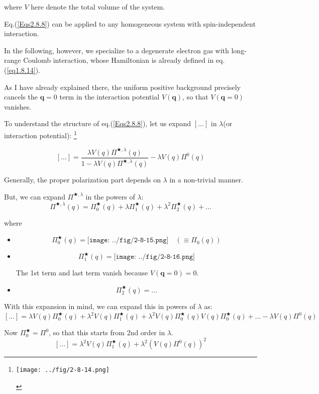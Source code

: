 where $V$ here denote the total volume of the system.

Eq.(\ref{Eqs2.8.8}) can be applied to any homogeneous system with spin-independent interaction.

In the following, however, we specialize to a degenerate electron gas with long-range Coulomb interaction, whose Hamiltonian is already defined in eq.(\ref{eq1.8.14}).

As I have already explained there, the uniform positive background precisely cancels the $\mathbf{q}=0$ term in the interaction potential $V(\mathbf{q})$, so that $V(\mathbf{q}=0)$ vanishes.

To understand the structure of eq.(\ref{Eqs2.8.8}), let us expand $\left[ \ldots \right]$ in $\lambda$(or interaction potential):
\footnote{\begin{center} \label{Fig2.8.14}
\texttt{[image: ../fig/2-8-14.png]}
\end{center}}

\[[\ldots] = \frac{\lambda V(q)\Pi^{\bigstar,\lambda}(q)}{1-\lambda V(q)\Pi^{\bigstar,\lambda}(q)} - \lambda V(q)\Pi^0(q)\]

Generally, the proper polarization part depends on $\lambda$ in a non-trivial manner.

But, we can expand $\Pi^{\bigstar,\lambda}$ in the powers of $\lambda$:
\[ \Pi^{\bigstar,\lambda}(q) = \Pi^{\bigstar}_0(q) + \lambda\Pi^{\bigstar}_1(q)+\lambda^2 \Pi^{\bigstar}_2(q) + \ldots \]

where
\begin{itemize}
\item \[\Pi_0^\bigstar(q)= \texttt{[image: ../fig/2-8-15.png]}\quad(\equiv \Pi_0(q))\]

\item \[\Pi_1^\bigstar(q) = \texttt{[image: ../fig/2-8-16.png]} \]

The 1st term and last term vanish because $V(\mathbf{q}=0)=0$.

\item \[\Pi_2^\bigstar(q) = \ldots\]
\end{itemize}

With this expansion in mind, we can expand this in powers of $\lambda$ as:
\[ [\ldots] = \lambda V(q) \Pi_0^\bigstar(q) + \lambda^2 V(q) \Pi_1^\bigstar(q) + \lambda^2 V(q) \Pi_0^\bigstar(q) V(q) \Pi_0^\bigstar(q) + \ldots - \lambda V(q) \Pi^0(q)\]

Now $\Pi_0^\bigstar = \Pi^0$, so that this starts from 2nd order in $\lambda$.
\[ [\ldots] = \lambda^2 V(q) \Pi_1^\bigstar(q) + \lambda^2 \left( V(q) \Pi^0 (q) \right)^2 \]

